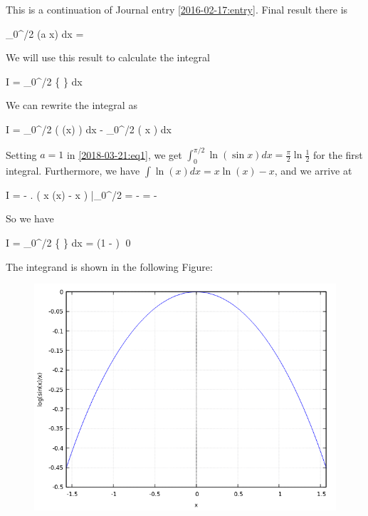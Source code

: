 
This is a continuation of Journal entry \ref{2016-02-17:entry}. Final result there is

\be
\label{2018-03-21:eq1}
\int_0^{\pi/2} \ln(a \sin x) dx =  \ln {}
\ee

We will use this result to calculate the integral

\bee
I = \int_{0}^{\pi/2} \ln \left\{ \right\} dx
\eee

We can rewrite the integral as

\bee
I = \int_{0}^{\pi/2} \ln \left( \sin(x) \right) dx - \int_{0}^{\pi/2} \ln \left( x \right) dx
\eee

Setting $a=1$ in \eqref{2018-03-21:eq1}, we get $\int_0^{\pi/2} \ln(\sin x) dx = \frac{\pi}{2} \ln \frac{1}{2}$ for the first integral. Furthermore, we have $\int \ln(x) dx = x \ln(x)-x$, and we arrive at

\bee
I =  - \left. \left( x \ln(x) - x \right) \right|_{0}^{\pi/2} =  -  =  -  \log \pi
\eee

So we have

\bee
I = \int_{0}^{\pi/2} \ln \left\{ \right\} dx =  (1 - \log \pi)  \qed
\eee

The integrand is shown in the following Figure:

\begin{figure}[H]
	\includegraphics[scale=0.7]{images/interesting_integrals_06_1.png}
\end{figure}

